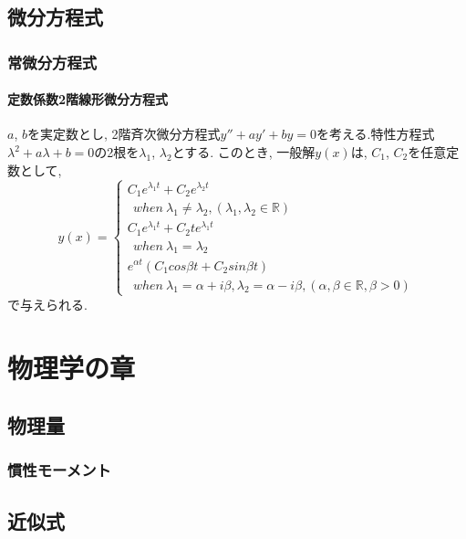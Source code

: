 \documentclass[]{jreport}
\begin{document}
\chapter{微分方程式}
\section{常微分方程式}
\subsection{定数係数2階線形微分方程式}

$a$, $b$を実定数とし, 2階斉次微分方程式$y''+ay'+by=0$を考える.特性方程式$\lambda^2+a\lambda+b=0$の2根を$\lambda_{1}$, $\lambda_{2}$とする. このとき, 一般解$y(x)$は, $C_{1}$, $C_{2}$を任意定数として, \\
\begin{equation}
    y(x)= \left \{
        \begin{array}{l}
            C_{1}e^{\lambda_{1} t}+C_{2}e^{\lambda_{2} t}\\
            \ \ when \ \lambda_{1}\neq\lambda_{2}, (\lambda_{1}, \lambda_{2}\in\mathbb{R}) \\
            C_{1}e^{\lambda_{1} t}+C_{2}te^{\lambda_{1} t}\\
            \ \ when \ \lambda_{1}=\lambda_{2} \\
            e^{\alpha t}(C_{1}cos{\beta t}+C_{2}sin{\beta t}) \\
            \ \ when \ \lambda_{1}=\alpha+{i\beta}, \lambda_{2}=\alpha-{i\beta}, (\alpha, \beta\in\mathbb{R}, \beta>0)
        \end{array}
    \right.
\end{equation}
で与えられる.

\part{物理学の章}
\chapter{物理量}

\section{慣性モーメント}

\chapter{近似式}
\end{document}
